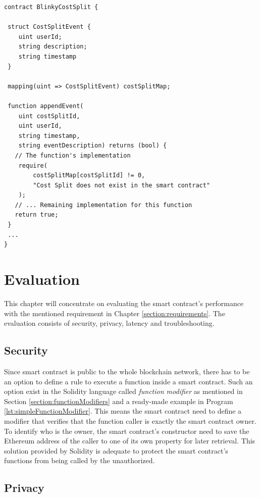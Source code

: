 \documentclass[twoside,numperchapter]{tutthesis} %
\begin{document}
\begin{lstlisting}[float,caption={Using \texttt{require} function to validate input data},label={lst:assertValidateInput},language=Solidity]
contract BlinkyCostSplit {
 
 struct CostSplitEvent {
    uint userId;
    string description;
    string timestamp
 }
 
 mapping(uint => CostSplitEvent) costSplitMap;
 
 function appendEvent(
    uint costSplitId,
    uint userId,
    string timestamp,
    string eventDescription) returns (bool) {
   // The function's implementation
    require(
        costSplitMap[costSplitId] != 0,
        "Cost Split does not exist in the smart contract"
    );
   // ... Remaining implementation for this function
   return true;
 }
 ...
}
\end{lstlisting}

\chapter{Evaluation}
\label{ch:evaluation}

This chapter will concentrate on evaluating the smart contract's performance with the mentioned requirement in Chapter \ref{section:requirements}. The evaluation consists of security, privacy, latency and troubleshooting.

\section{Security}
\label{section:security}

Since smart contract is public to the whole blockchain network, there has to be an option to define a rule to execute a function inside a smart contract. Such an option exist in the Solidity language called \textit{function modifier} as mentioned in Section \ref{section:functionModifiers} and a ready-made example in Program \ref{lst:simpleFunctionModifier}. This means the smart contract need to define a modifier that verifies that the function caller is exactly the smart contract owner. To identify who is the owner, the smart contract's constructor need to save the Ethereum address of the caller to one of its own property for later retrieval. This solution provided by Solidity is adequate to protect the smart contract's functions from being called by the unauthorized.

\section{Privacy}
\end{document}
